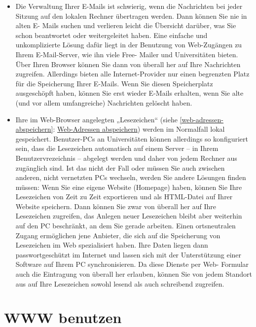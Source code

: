 \documentclass[]{book}
\providecommand{\tightlist}{%
  \setlength{\itemsep}{0pt}\setlength{\parskip}{0pt}}
\theoremstyle{definition}
\theoremstyle{definition}
\theoremstyle{definition}
\theoremstyle{remark}
\begin{document}
\begin{itemize}
\tightlist
\item
  Die Verwaltung Ihrer E-Mails ist schwierig, wenn die Nachrichten bei
  jeder Sitzung auf den lokalen Rechner übertragen werden. Dann können
  Sie nie in alten E- Mails suchen und verlieren leicht die Übersicht
  darüber, was Sie schon beantwortet oder weitergeleitet haben. Eine
  einfache und unkomplizierte Lösung dafür liegt in der Benutzung von
  Web-Zugängen zu Ihrem E-Mail-Server, wie ihn viele Free- Mailer und
  Universitäten bieten. Über Ihren Browser können Sie dann von überall
  her auf Ihre Nachrichten zugreifen. Allerdings bieten alle
  Internet-Provider nur einen begrenzten Platz für die Speicherung Ihrer
  E-Mails. Wenn Sie diesen Speicherplatz ausgeschöpft haben, können Sie
  erst wieder E-Mails erhalten, wenn Sie alte (und vor allem
  umfangreiche) Nachrichten gelöscht haben.
\item
  Ihre im Web-Browser angelegten „Lesezeichen`` (siehe
  \ref{web-adressen-abspeichern}:
  \protect\hyperlink{web-adressen-abspeichern}{Web-Adressen
  abspeichern}) werden im Normalfall lokal gespeichert. Benutzer-PCs an
  Universitäten können allerdings so konfiguriert sein, dass die
  Lesezeichen automatisch auf einem Server -- in Ihrem
  Benutzervrezeichnis -- abgelegt werden und daher von jedem Rechner aus
  zugänglich sind. Ist das nicht der Fall oder müssen Sie auch zwischen
  anderen, nicht vernetzten PCs wechseln, werden Sie andere Lösungen
  finden müssen: Wenn Sie eine eigene Website (Homepage) haben, können
  Sie Ihre Lesezeichen von Zeit zu Zeit exportieren und als HTML-Datei
  auf Ihrer Website speichern. Dann können Sie zwar von überall her auf
  Ihre Lesezeichen zugreifen, das Anlegen neuer Lesezeichen bleibt aber
  weiterhin auf den PC beschränkt, an dem Sie gerade arbeiten. Einen
  ortsneutralen Zugang ermöglichen jene Anbieter, die sich auf die
  Speicherung von Lesezeichen im Web spezialisiert haben. Ihre Daten
  liegen dann passwortgeschützt im Internet und lassen sich mit der
  Unterstützung einer Software auf Ihrem PC synchronisieren. Da diese
  Dienste per Web- Formular auch die Eintragung von überall her
  erlauben, können Sie von jedem Standort aus auf Ihre Lesezeichen
  sowohl lesend als auch schreibend zugreifen.
\end{itemize}

\section{WWW benutzen}\label{www-benutzen}
\end{document}
